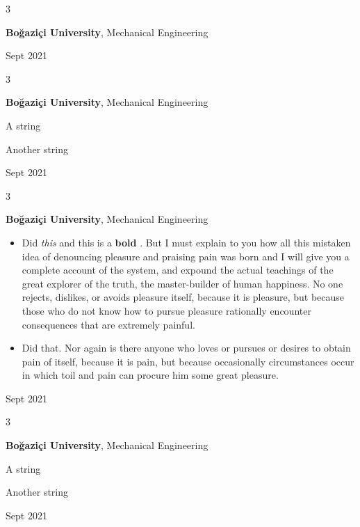 \documentclass[10pt, letterpaper]{article}
\newenvironment{summary}{
    \begin{description}[
        topsep=0.10 cm,
        parsep=0.10 cm,
        partopsep=0pt,
        itemsep=0pt,
        leftmargin=0.4 cm + 10pt
    ]
}{
    \end{description}
} %
\newenvironment{highlights}{
    \begin{itemize}[
        topsep=0.10 cm,
        parsep=0.10 cm,
        partopsep=0pt,
        itemsep=0pt,
        leftmargin=0.4 cm + 10pt
    ]
}{
    \end{itemize}
} %
\newenvironment{threecolentry}[3][]{
    \onecolentry
    \def\thirdColumn{#3}
    \setcolumnwidth{1 cm, \fill, 4.5 cm}
    \begin{paracol}{3}
    {\raggedright #2} \switchcolumn
}{
    \switchcolumn \raggedleft \thirdColumn
    \end{paracol}
    \endonecolentry
} %
\let\hrefWithoutArrow\href
\renewcommand{\href}[2]{\hrefWithoutArrow{#1}{\ifthenelse{\equal{#2}{}}{ }{#2 }\raisebox{.15ex}{\footnotesize \faExternalLink*}}}
\begin{document}
        \vspace{0.2 cm}

        \begin{threecolentry}{\textbf{}}{
            Sept 2021
        }
            \textbf{Boğaziçi University}, Mechanical Engineering
        \end{threecolentry}

        \vspace{0.2 cm}

        \begin{threecolentry}{\textbf{}}{
            Sept 2021
        }
            \textbf{Boğaziçi University}, Mechanical Engineering
            \begin{summary}
                \item A string
                \item Another string
            \end{summary}
        \end{threecolentry}

        \vspace{0.2 cm}

        \begin{threecolentry}{\textbf{}}{
            Sept 2021
        }
            \textbf{Boğaziçi University}, Mechanical Engineering
            \begin{highlights}
                \item Did \textit{this} and this is a \textbf{bold} \href{https://example.com}{link}. But I must explain to you how all this mistaken idea of denouncing pleasure and praising pain was born and I will give you a complete account of the system, and expound the actual teachings of the great explorer of the truth, the master-builder of human happiness. No one rejects, dislikes, or avoids pleasure itself, because it is pleasure, but because those who do not know how to pursue pleasure rationally encounter consequences that are extremely painful.
                \item Did that. Nor again is there anyone who loves or pursues or desires to obtain pain of itself, because it is pain, but because occasionally circumstances occur in which toil and pain can procure him some great pleasure.
            \end{highlights}
        \end{threecolentry}

        \vspace{0.2 cm}

        \begin{threecolentry}{\textbf{}}{
            Sept 2021
        }
            \textbf{Boğaziçi University}, Mechanical Engineering
            \begin{summary}
                \item A string
                \item Another string
            \end{summary}
        \end{threecolentry}
\end{document}
